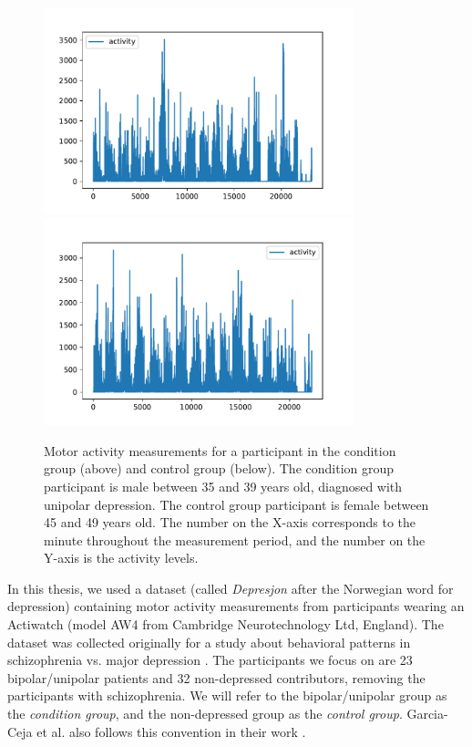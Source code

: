 \begin{figure}[!ht]
  \centering
  \includegraphics[height=6cm]{img/activity_condition_1.pdf}
  \includegraphics[height=6cm]{img/activity_control_1.pdf}
  \caption{Motor activity measurements for a participant in the condition group (above) and control group (below). The condition group participant is male between 35 and 39 years old, diagnosed with unipolar depression. The control group participant is female between 45 and 49 years old. The number on the X-axis corresponds to the minute throughout the measurement period, and the number on the Y-axis is the activity levels.}
  \label{figure:participant_activity}
\end{figure}

In this thesis, we used a dataset (called \textit{Depresjon} after the Norwegian word for depression) containing motor activity measurements from participants wearing an Actiwatch (model AW4 from Cambridge Neurotechnology Ltd, England). The dataset was collected originally for a study about behavioral patterns in schizophrenia vs. major depression \cite{Berle2010}. The participants we focus on are 23 bipolar/unipolar patients and 32 non-depressed contributors, removing the participants with schizophrenia. We will refer to the bipolar/unipolar group as the \textit{condition group}, and the non-depressed group as the \textit{control group}. Garcia-Ceja et al. also follows this convention in their work \cite{GarciaCeja2018_classification_bipolar}.

